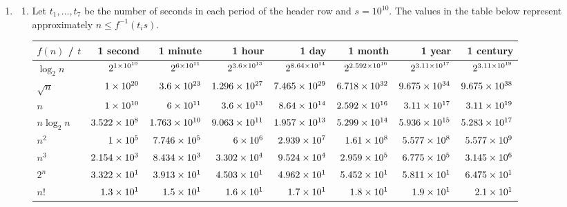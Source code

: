 \documentclass[12pt]{article}
\begin{document}
\begin{enumerate}
\begin{enumerate}
    \end{enumerate}
    \item 
    \begin{enumerate}
        \item Let $t_{1}, \dots, t_{7}$ be the number of seconds in each period of the header row and $s = 10^{10}$. The values in the table below represent approximately $n \leq f^{-1}(t_{i} s)$.
        \begin{table}[htbp]
            \renewcommand{\arraystretch}{1.2}
            \setlength{\tabcolsep}{7pt}
            \centering
            \tiny
            \begin{tabular}{l*{7}{r}}
                \toprule
                $f(n)$ / $t$ & 1 second & 1 minute & 1 hour & 1 day & 1 month & 1 year & 1 century \\ \midrule
                $\log_{2} n$ & $2^{\num{1.E+10}}$ & $2^{\num{6.E+11}}$ & $2^{\num{3.6E+13}}$ & $2^{\num{8.64E+14}}$ & $2^{\num{2.592E+16}}$ & $2^{\num{3.11E+17}}$ & $2^{\num{3.11E+19}}$ \\
                $\sqrt{n}$ & $\num{1.E+20}$ & $\num{3.6E+23}$ & $\num{1.296E+27}$ & $\num{7.465E+29}$ & $\num{6.718E+32}$ & $\num{9.675E+34}$ & $\num{9.675E+38}$ \\
                $n$ & $\num{1.E+10}$ & $\num{6.E+11}$ & $\num{3.6E+13}$ & $\num{8.64E+14}$ & $\num{2.592E+16}$ & $\num{3.11E+17}$ & $\num{3.11E+19}$ \\
                $n \log_{2} n$ & $\num{3.522E+08}$ & $\num{1.763E+10}$ & $\num{9.063E+11}$ & $\num{1.957E+13}$ & $\num{5.299E+14}$ & $\num{5.936E+15}$ & $\num{5.283E+17}$ \\
                $n^{2}$ & $\num{1.E+05}$ & $\num{7.746E+05}$ & $\num{6.E+06}$ & $\num{2.939E+07}$ & $\num{1.61E+08}$ & $\num{5.577E+08}$ & $\num{5.577E+09}$ \\
                $n^{3}$ & $\num{2.154E+03}$ & $\num{8.434E+03}$ & $\num{3.302E+04}$ & $\num{9.524E+04}$ & $\num{2.959E+05}$ & $\num{6.775E+05}$ & $\num{3.145E+06}$ \\
                $2^{n}$ & $\num{3.322E+01}$ & $\num{3.913E+01}$ & $\num{4.503E+01}$ & $\num{4.962E+01}$ & $\num{5.452E+01}$ & $\num{5.811E+01}$ & $\num{6.475E+01}$ \\
                $n!$ & $\num{1.3E+01}$ & $\num{1.5E+01}$ & $\num{1.6E+01}$ & $\num{1.7E+01}$ & $\num{1.8E+01}$ & $\num{1.9E+01}$ & $\num{2.1E+01}$ \\
                \bottomrule
            \end{tabular}
        \end{table}

\end{enumerate}
\end{enumerate}
\end{document}
